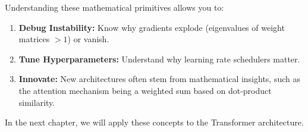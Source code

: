 Understanding these mathematical primitives allows you to:
\begin{enumerate}
    \item \textbf{Debug Instability:} Know why gradients explode (eigenvalues of weight matrices $> 1$) or vanish.
    \item \textbf{Tune Hyperparameters:} Understand why learning rate schedulers matter.
    \item \textbf{Innovate:} New architectures often stem from mathematical insights, such as the attention mechanism being a weighted sum based on dot-product similarity.
\end{enumerate}

In the next chapter, we will apply these concepts to the Transformer architecture.
